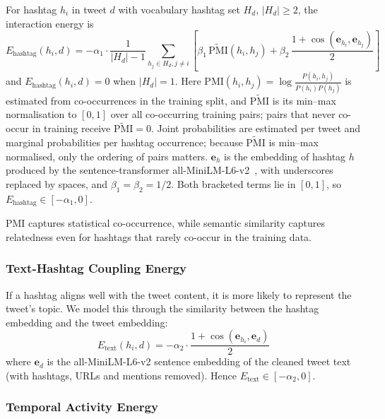 \documentclass[pdflatex,sn-mathphys-num]{sn-jnl}%
\begin{document}
For hashtag $h_i$ in tweet $d$ with vocabulary hashtag set $H_d$, $|H_d| \ge 2$, the interaction energy is
\begin{equation}
E_{\text{hashtag}}(h_i, d) = -\alpha_1 \cdot \frac{1}{|H_d| - 1} \sum_{h_j \in H_d, j \neq i} \left[ \beta_1\, \widetilde{\text{PMI}}(h_i, h_j) + \beta_2\, \frac{1 + \cos(\mathbf{e}_{h_i}, \mathbf{e}_{h_j})}{2} \right]
\label{eq:hashtag}
\end{equation}
and $E_{\text{hashtag}}(h_i,d)=0$ when $|H_d| = 1$. Here $\text{PMI}(h_i, h_j) = \log \frac{P(h_i, h_j)}{P(h_i)P(h_j)}$ is estimated from co-occurrences in the training split, and $\widetilde{\text{PMI}}$ is its min--max normalisation to $[0,1]$ over all co-occurring training pairs; pairs that never co-occur in training receive $\widetilde{\text{PMI}} = 0$. Joint probabilities are estimated per tweet and marginal probabilities per hashtag occurrence; because $\widetilde{\text{PMI}}$ is min--max normalised, only the ordering of pairs matters. $\mathbf{e}_{h}$ is the embedding of hashtag $h$ produced by the sentence-transformer all-MiniLM-L6-v2~\cite{reimers2019}, with underscores replaced by spaces, and $\beta_1 = \beta_2 = 1/2$. Both bracketed terms lie in $[0,1]$, so $E_{\text{hashtag}} \in [-\alpha_1, 0]$.

PMI captures statistical co-occurrence, while semantic similarity captures relatedness even for hashtags that rarely co-occur in the training data.

\subsubsection{Text-Hashtag Coupling Energy}\label{subsubsec2}

If a hashtag aligns well with the tweet content, it is more likely to represent the tweet's topic. We model this through the similarity between the hashtag embedding and the tweet embedding:
\begin{equation}
E_{\text{text}}(h_i, d) = -\alpha_2 \cdot \frac{1 + \cos(\mathbf{e}_{h_i}, \mathbf{e}_{d})}{2}
\label{eq:text}
\end{equation}
where $\mathbf{e}_d$ is the all-MiniLM-L6-v2 sentence embedding of the cleaned tweet text (with hashtags, URLs and mentions removed). Hence $E_{\text{text}} \in [-\alpha_2, 0]$.

\subsubsection{Temporal Activity Energy}\label{subsubsec3}
\end{document}
